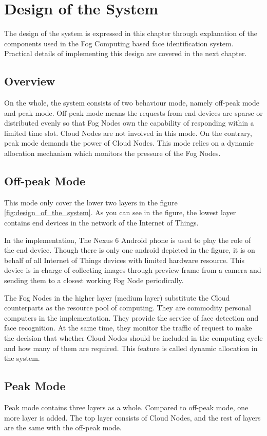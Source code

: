 \chapter{Design of the System} \label{chap:design}
The design of the system is expressed in this chapter through explanation of the components used in the Fog Computing based face identification system. Practical details of implementing this design are covered in the next chapter.

\section{Overview}
On the whole, the system consists of two behaviour mode, namely off-peak mode and peak mode. Off-peak mode means the requests from end devices are sparse or distributed evenly so that Fog Nodes own the capability of responding within a limited time slot. Cloud Nodes are not involved in this mode. On the contrary, peak mode demands the power of Cloud Nodes. This mode relies on a dynamic allocation mechanism which monitors the pressure of the Fog Nodes.

\section{Off-peak Mode}
This mode only cover the lower two layers in the figure \ref{fig:design_of_the_system}. As you can see in the figure, the lowest layer contains end devices in the network of the Internet of Things. 

In the implementation, The Nexus 6 Android phone is used to play the role of the end device. Though there is only one android depicted in the figure, it is on behalf of all Internet of Things devices with limited hardware resource. This device is in charge of collecting images through preview frame from a camera and sending them to a closest working Fog Node periodically.

The Fog Nodes in the higher layer (medium layer) substitute the Cloud counterparts as the resource pool of computing. They are commodity personal computers in the implementation. They provide the service of face detection and face recognition. At the same time, they monitor the traffic of request to make the decision that whether Cloud Nodes should be included in the computing cycle and how many of them are required. This feature is called dynamic allocation in the system.

\section{Peak Mode}
Peak mode contains three layers as a whole. Compared to off-peak mode, one more layer is added. The top layer consists of Cloud Nodes, and the rest of layers are the same with the off-peak mode.

